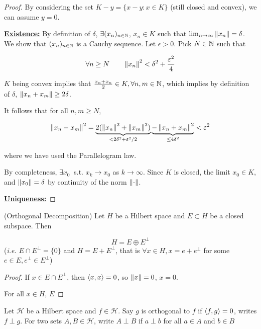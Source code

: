 \documentclass{article}
\begin{document}
\begin{proof} 
By considering the set $K-y = \{x-y: x\in K\}$ (still closed and convex), we can assume $y=0$.  

\underline{\textbf{Existence:}}
By definition of $\delta$, $\exists (x_n)_{n \in \mathbb{N}}$, $x_n\in K$ such that $\lim_{n \to \infty} \left\|{x_n}\right\|=\delta$. We show that $(x_n)_{n \in \mathbb{N}}$ is a Cauchy sequence. Let $\epsilon >0$. Pick $N \in \mathbb{N}$ such that  

$$
\forall n \geq N \qquad \left\|{x_n}\right\|^2 < \delta^2 + \frac{\varepsilon^2}{4}
$$  

$K$ being convex implies that $\frac{x_n+x_n}{2} \in K, \forall n,m \in \mathbb{N}$, which implies by definition of $\delta$, $\left\|{x_n+x_m}\right\| \geq 2\delta$.  

It follows that for all $n,m \geq N$,  

\begin{equation*}
    \left\|{x_n-x_m}\right\|^2 = \underbrace{2(\left\|{x_n}\right\|^2+\left\|{x_m}\right\|^2)}_{< 2\delta^2 + \varepsilon^2 /2} \underbrace{-\left\|{x_n+x_m}\right\|^2}_{\leq 4\delta^2} < \varepsilon^2
\end{equation*}  

where we have used the Parallelogram law.  

By completeness, $\exists x_0 \ $ s.t. $x_k \to x_0$ as $k \to \infty$. Since $K$ is closed, the limit $x_0\in K$, and $\left\|{x_0}\right\|=\delta$ by continuity of the norm $\left\|{\cdot}\right\|$.  

\underline{\textbf{Uniqueness:}}
\end{proof}  

\begin{corollary}
(Orthogonal Decomposition) Let $H$ be a Hilbert space and $E \subset H$ be a closed subspace. Then  

$$
H = E \oplus E^{\perp}
$$  
(\textit{i.e.} $E \cap E^{\perp} = \{0\}$ and $H = E + E^{\perp}$, that is $\forall x \in H, x=e+ e^{\perp}$ for some $e \in E, e^{\perp} \in E^{\perp}$)
\end{corollary}

\begin{proof}
If $x \in E\cap E^{\perp}$, then $\left<{x},{x}\right>=0$, so $\left\|{x}\right\|=0$, $x=0$.  

For all $x\in H$, $E$
\end{proof}

\begin{definition}[Orthogonality]\rm\nextline
	Let $\mathscr{H}$ be a Hilbert space and $f\in\mathscr{H}$. Say $g$ is orthogonal to $f$ if $\left<{f},{g}\right>=0$, writes $f\perp g$. For two sets $A,B\in \mathscr{H}$, write $A\perp B$ if $a\perp b$ for all $a\in A$ and $b\in B$


\end{definition}
\end{document}

